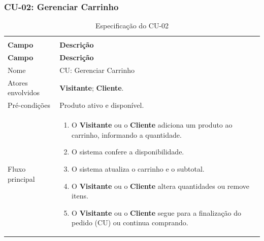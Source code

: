 \documentclass[12pt,a4paper]{article}
\begin{document}
\Needspace{200pt}
\subsubsection{CU-02: Gerenciar Carrinho}

{\setlength{\arrayrulewidth}{0.3pt}\renewcommand{\arraystretch}{1.1}\small{}
\begin{xltabular}{\textwidth}{>{\raggedright\arraybackslash}p{3.4cm}|>{\raggedright\arraybackslash}X}
\caption{Especificação do CU-02}\\
\toprule{}
\textbf{Campo} & \textbf{Descrição}\\ \midrule{}
\endfirsthead
{}\toprule{}
\textbf{Campo} & \textbf{Descrição}\\ \midrule{}
\endhead
\endlastfoot
Nome & CU: Gerenciar Carrinho\\ \hline
Atores envolvidos & \textbf{Visitante}; \textbf{Cliente}.\\ \hline
Pré-condições & Produto ativo e disponível.\\ \hline
Fluxo principal & \begin{enumerate}[nosep,leftmargin=1.4em,label=\arabic*.,before=\vspace{-\baselineskip},after=\vspace{-0.4\baselineskip}]\item O \textbf{Visitante} ou o \textbf{Cliente} adiciona um produto ao carrinho, informando a quantidade. \item O sistema confere a disponibilidade. \item O sistema atualiza o carrinho e o subtotal. \item O \textbf{Visitante} ou o \textbf{Cliente} altera quantidades ou remove itens. \item O \textbf{Visitante} ou o \textbf{Cliente} segue para a finalização do pedido (CU) ou continua comprando. \end{enumerate}\\ \hline

\end{xltabular}}
\end{document}
